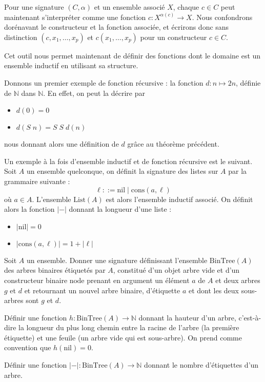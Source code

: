 \begin{remark}
  Pour une signature $(C,\alpha)$ et un ensemble associé $X$, chaque $c\in C$
  peut maintenant s'interpréter comme une fonction $c : X^{\alpha(c)}\to X$. Nous
  confondrons dorénavant le constructeur et la fonction associée, et écrirons
  donc sans distinction $(c,x_1,\ldots,x_p)$ et $c(x_1,\ldots,x_p)$ pour un
  constructeur $c \in C$.
\end{remark}

Cet outil nous permet maintenant de définir des fonctions dont le domaine est
un ensemble inductif en utilisant sa structure.

\begin{example}
  Donnons un premier exemple de fonction récursive : la fonction
  $d :n\mapsto 2n$, définie de $\mathbb N$ dans $\mathbb N$. En effet, on peut
  la décrire par
  \begin{itemize}
  \item $d(0) = 0$
  \item $d(S\;n) = S\;S\;d(n)$
  \end{itemize}
  nous donnant alors une définition de $d$ grâce au théorème précédent.
\end{example}

\begin{example}
  Un exemple à la fois d'ensemble inductif et de fonction récursive est le
  suivant. Soit $A$ un ensemble quelconque, on définit la signature des listes
  sur $A$ par la grammaire suivante :
  $$\ell ::= \mathrm{nil}\mid \mathrm{cons}(a,\ell)$$
  où $a\in A$. L'ensemble $\mathrm{List}(A)$ est alors l'ensemble inductif
  associé. On définit alors la fonction $|-|$ donnant la longueur d'une
  liste :
  \begin{itemize}
  \item $|\mathrm{nil}| = 0$
  \item $|\mathrm{cons}(a,\ell)| = 1 + |\ell|$
  \end{itemize}
\end{example}

\begin{exercise}
  Soit $A$ un ensemble. Donner une signature définissant l'ensemble
  $\mathrm{BinTree}(A)$ des arbres
  binaires étiquetés par $A$, constitué d'un objet arbre vide et d'un
  constructeur binaire $\mathrm{node}$ prenant en argument un élément $a$ de $A$
  et deux arbres $g$ et $d$ et retournant un nouvel arbre binaire, d'étiquette
  $a$ et dont les deux sous-arbres sont $g$ et $d$.

  Définir une fonction $h : \mathrm{BinTree}(A) \to \mathbb N$ donnant la
  hauteur d'un arbre, c'est-à-dire la longueur du plus long chemin entre la
  racine de l'arbre (la première étiquette) et une feuile (un arbre vide qui est
  sous-arbre). On prend comme convention que $h(\mathrm{nil}) = 0$.

  Définir une fonction $|-| : \mathrm{BinTree}(A) \to \mathbb N$ donnant le
  nombre d'étiquettes d'un arbre.
\end{exercise}

